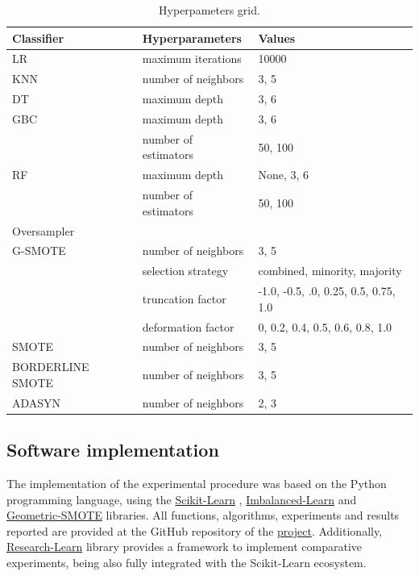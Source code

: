 \documentclass[remotesensing,article,submit,moreauthors,pdftex]{Definitions/mdpi}
\begin{document}
\begin{table}[H]
	\centering
	\begin{tabular}{lll}
		\toprule
		Classifier       & Hyperparameters & Values\\
		\hline
		LR               & maximum iterations   & 10000   \\
		KNN              & number of neighbors  & {3, 5} \\
		DT               & maximum depth        & {3, 6} \\
		GBC              & maximum depth        & {3, 6} \\
    			 		 & number of estimators & {50, 100} \\
		RF               & maximum depth        & {None, 3, 6} \\
				 		 & number of estimators & {50, 100} \\
		\toprule
		Oversampler      &                      & \\
		\hline
		G-SMOTE          & number of neighbors  & {3, 5} \\
				 		 & selection strategy   & combined, minority, majority\\
				 		 & truncation factor    & {-1.0, -0.5, .0, 0.25, 0.5,
				 		 0.75, 1.0} \\
				 		 & deformation factor   & {0, 0.2, 0.4, 0.5, 0.6, 0.8,
				 		 1.0} \\
 		SMOTE            & number of neighbors & {3, 5} \\
		BORDERLINE SMOTE & number of neighbors & {3, 5} \\
		ADASYN           & number of neighbors & {2, 3} \\
		\bottomrule
	\end{tabular}
	\caption{\label{tab:grid}Hyperpameters grid.}
\end{table}

\subsection{Software implementation}

The implementation of the experimental procedure was based on the Python
programming language, using the
\href{https://scikit-learn.org/stable/}{Scikit-Learn} \cite{Pedregosa2011},
\href{https://imbalanced-learn.org/en/stable/}{Imbalanced-Learn} \cite{JMLR:v18:16-365}
and
\href{https://geometric-smote.readthedocs.io/en/latest/?badge=latest}{Geometric-SMOTE}
libraries. All functions, algorithms, experiments and results reported are
provided at the GitHub repository of the
\href{https://github.com/AlgoWit/publications/tree/master/remote-sensing-lucas}{project}.
Additionally,
\href{https://research-learn.readthedocs.io/en/latest/?badge=latest}{Research-Learn}
library provides a framework to implement comparative experiments, being also
fully integrated with the Scikit-Learn ecosystem.
\end{document}
